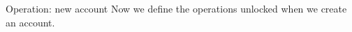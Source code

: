 \begin{frame}{Operation: new account}
  Now we define the operations unlocked when we create an account.

  \centering
  \inputminted{js}{./code/example2_new_account_links.jsch}
\end{frame}




